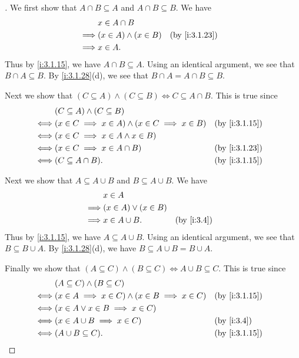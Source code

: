 \begin{proof}[]
  We first show that \(A \cap B \subseteq A\) and \(A \cap B \subseteq B\).
  We have
  \begin{align*}
             & x \in A \cap B                               \\
    \implies & (x \in A) \land (x \in B) &  & \by{i:3.1.23} \\
    \implies & x \in A.
  \end{align*}
  Thus by \cref{i:3.1.15}, we have \(A \cap B \subseteq A\).
  Using an identical argument, we see that \(B \cap A \subseteq B\).
  By \cref{i:3.1.28}(d), we see that \(B \cap A = A \cap B \subseteq B\).

  Next we show that \((C \subseteq A) \land (C \subseteq B) \iff C \subseteq A \cap B\).
  This is true since
  \begin{align*}
         & (C \subseteq A) \land (C \subseteq B)                                          \\
    \iff & (x \in C \implies x \in A) \land (x \in C \implies x \in B) &  & \by{i:3.1.15} \\
    \iff & (x \in C \implies x \in A \land x \in B)                                       \\
    \iff & (x \in C \implies x \in A \cap B)                           &  & \by{i:3.1.23} \\
    \iff & (C \subseteq A \cap B).                                     &  & \by{i:3.1.15}
  \end{align*}

  Next we show that \(A \subseteq A \cup B\) and \(B \subseteq A \cup B\).
  We have
  \begin{align*}
             & x \in A                                  \\
    \implies & (x \in A) \lor (x \in B)                 \\
    \implies & x \in A \cup B.          &  & \by{i:3.4}
  \end{align*}
  Thus by \cref{i:3.1.15}, we have \(A \subseteq A \cup B\).
  Using an identical argument, we see that \(B \subseteq B \cup A\).
  By \cref{i:3.1.28}(d), we have \(B \subseteq A \cup B = B \cup A\).

  Finally we show that \((A \subseteq C) \land (B \subseteq C) \iff A \cup B \subseteq C\).
  This is true since
  \begin{align*}
         & (A \subseteq C) \land (B \subseteq C)                                          \\
    \iff & (x \in A \implies x \in C) \land (x \in B \implies x \in C) &  & \by{i:3.1.15} \\
    \iff & (x \in A \lor x \in B \implies x \in C)                                        \\
    \iff & (x \in A \cup B \implies x \in C)                           &  & \by{i:3.4}    \\
    \iff & (A \cup B \subseteq C).                                     &  & \by{i:3.1.15}
  \end{align*}
\end{proof}

